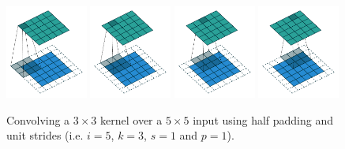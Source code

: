 \documentclass{report}
\begin{document}
\begin{figure}[p]
    \centering
    \includegraphics[width=0.24\textwidth]{pdf/same_padding_no_strides_00.pdf}
    \includegraphics[width=0.24\textwidth]{pdf/same_padding_no_strides_01.pdf}
    \includegraphics[width=0.24\textwidth]{pdf/same_padding_no_strides_02.pdf}
    \includegraphics[width=0.24\textwidth]{pdf/same_padding_no_strides_03.pdf}
    \caption{\label{fig:same_padding_no_strides} Convolving a $3 \times 3$
        kernel over a $5 \times 5$ input using half padding and unit strides
        (i.e. $i = 5$, $k = 3$, $s = 1$ and $p = 1$).}
\end{figure}
\end{document}
